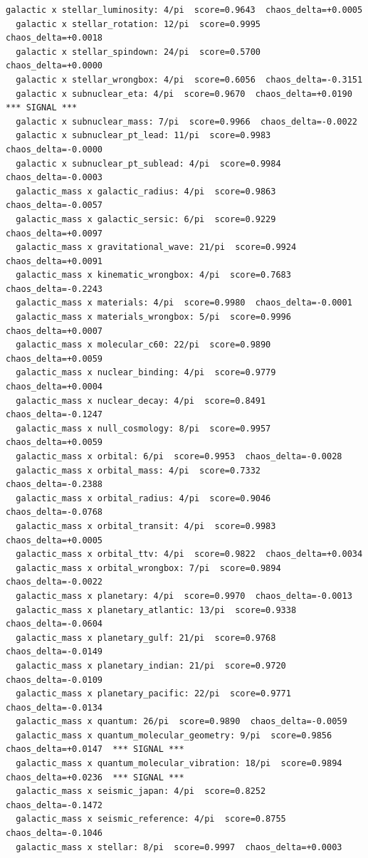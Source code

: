 \documentclass[11pt, letterpaper, openany]{book}
\begin{document}
\begin{empiricalbox}
\begin{lstlisting}[style=terminal]
  galactic x stellar_luminosity: 4/pi  score=0.9643  chaos_delta=+0.0005
  galactic x stellar_rotation: 12/pi  score=0.9995  chaos_delta=+0.0018
  galactic x stellar_spindown: 24/pi  score=0.5700  chaos_delta=+0.0000
  galactic x stellar_wrongbox: 4/pi  score=0.6056  chaos_delta=-0.3151
  galactic x subnuclear_eta: 4/pi  score=0.9670  chaos_delta=+0.0190  *** SIGNAL ***
  galactic x subnuclear_mass: 7/pi  score=0.9966  chaos_delta=-0.0022
  galactic x subnuclear_pt_lead: 11/pi  score=0.9983  chaos_delta=-0.0000
  galactic x subnuclear_pt_sublead: 4/pi  score=0.9984  chaos_delta=-0.0003
  galactic_mass x galactic_radius: 4/pi  score=0.9863  chaos_delta=-0.0057
  galactic_mass x galactic_sersic: 6/pi  score=0.9229  chaos_delta=+0.0097
  galactic_mass x gravitational_wave: 21/pi  score=0.9924  chaos_delta=+0.0091
  galactic_mass x kinematic_wrongbox: 4/pi  score=0.7683  chaos_delta=-0.2243
  galactic_mass x materials: 4/pi  score=0.9980  chaos_delta=-0.0001
  galactic_mass x materials_wrongbox: 5/pi  score=0.9996  chaos_delta=+0.0007
  galactic_mass x molecular_c60: 22/pi  score=0.9890  chaos_delta=+0.0059
  galactic_mass x nuclear_binding: 4/pi  score=0.9779  chaos_delta=+0.0004
  galactic_mass x nuclear_decay: 4/pi  score=0.8491  chaos_delta=-0.1247
  galactic_mass x null_cosmology: 8/pi  score=0.9957  chaos_delta=+0.0059
  galactic_mass x orbital: 6/pi  score=0.9953  chaos_delta=-0.0028
  galactic_mass x orbital_mass: 4/pi  score=0.7332  chaos_delta=-0.2388
  galactic_mass x orbital_radius: 4/pi  score=0.9046  chaos_delta=-0.0768
  galactic_mass x orbital_transit: 4/pi  score=0.9983  chaos_delta=+0.0005
  galactic_mass x orbital_ttv: 4/pi  score=0.9822  chaos_delta=+0.0034
  galactic_mass x orbital_wrongbox: 7/pi  score=0.9894  chaos_delta=-0.0022
  galactic_mass x planetary: 4/pi  score=0.9970  chaos_delta=-0.0013
  galactic_mass x planetary_atlantic: 13/pi  score=0.9338  chaos_delta=-0.0604
  galactic_mass x planetary_gulf: 21/pi  score=0.9768  chaos_delta=-0.0149
  galactic_mass x planetary_indian: 21/pi  score=0.9720  chaos_delta=-0.0109
  galactic_mass x planetary_pacific: 22/pi  score=0.9771  chaos_delta=-0.0134
  galactic_mass x quantum: 26/pi  score=0.9890  chaos_delta=-0.0059
  galactic_mass x quantum_molecular_geometry: 9/pi  score=0.9856  chaos_delta=+0.0147  *** SIGNAL ***
  galactic_mass x quantum_molecular_vibration: 18/pi  score=0.9894  chaos_delta=+0.0236  *** SIGNAL ***
  galactic_mass x seismic_japan: 4/pi  score=0.8252  chaos_delta=-0.1472
  galactic_mass x seismic_reference: 4/pi  score=0.8755  chaos_delta=-0.1046
  galactic_mass x stellar: 8/pi  score=0.9997  chaos_delta=+0.0003

\end{lstlisting}
\end{empiricalbox}
\end{document}
